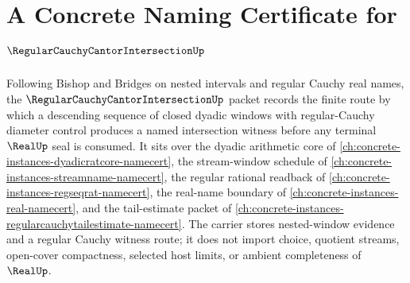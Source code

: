 \chapter{A Concrete Naming Certificate for $\RegularCauchyCantorIntersectionUp$}
\label{ch:concrete-instances-regular-cauchy-cantor-intersection-namecert}

Following Bishop and Bridges on nested intervals and regular Cauchy real names, the $\RegularCauchyCantorIntersectionUp$ packet records the finite route by which a descending sequence of closed dyadic windows with regular-Cauchy diameter control produces a named intersection witness before any terminal $\RealUp$ seal is consumed. It sits over the dyadic arithmetic core of \autoref{ch:concrete-instances-dyadicratcore-namecert}, the stream-window schedule of \autoref{ch:concrete-instances-streamname-namecert}, the regular rational readback of \autoref{ch:concrete-instances-regseqrat-namecert}, the real-name boundary of \autoref{ch:concrete-instances-real-namecert}, and the tail-estimate packet of \autoref{ch:concrete-instances-regularcauchytailestimate-namecert}. The carrier stores nested-window evidence and a regular Cauchy witness route; it does not import choice, quotient streams, open-cover compactness, selected host limits, or ambient completeness of $\RealUp$.

